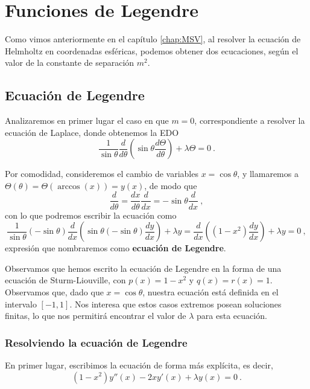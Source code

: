 \chapter{Funciones de Legendre}

Como vimos anteriormente en el capítulo \ref{chap:MSV}, al resolver la ecuación de Helmholtz en coordenadas esféricas, podemos obtener dos ecucaciones, según el valor de la constante de separación $m^2$. 

\section{Ecuación de Legendre}

Analizaremos en primer lugar el caso en que $m=0$, correspondiente a resolver la ecuación de Laplace, donde obtenemos la EDO
\begin{equation}
    \frac{1}{\sin\theta} \frac{d}{d\theta}\left( \sin\theta \frac{d\Theta}{d\theta} \right) + \lambda \Theta = 0 \ .
\end{equation}

Por comodidad, consideremos el cambio de variables $x = \cos\theta$, y llamaremos a $\Theta(\theta) = \Theta(\arccos(x)) = y(x)$, de modo que
\begin{equation}
    \frac{d}{d\theta} = \frac{dx}{d\theta} \frac{d}{dx} = -\sin\theta \frac{d}{dx} \ ,
\end{equation}
con lo que podremos escribir la ecuación como
\begin{equation}
    \frac{1}{\sin\theta}(-\sin\theta)\frac{d}{dx}\left( \sin\theta (-\sin\theta) \frac{dy}{dx} \right) + \lambda y = \frac{d}{dx}\left( (1-x^2) \frac{dy}{dx} \right) + \lambda y = 0 \ ,
\end{equation}
expresión que nombraremos como \textbf{ecuación de Legendre}.

Observamos que hemos escrito la ecuación de Legendre en la forma de una ecuación de Sturm-Liouville, con $p(x) = 1-x^2$ y $q(x) = r(x) = 1$. Observamos que, dado que $x=\cos\theta$, nuestra ecuación está definida en el intervalo $[-1,1]$. Nos interesa que estos casos extremos posean soluciones finitas, lo que nos permitirá encontrar el valor de $\lambda$ para esta ecuación.

\subsection{Resolviendo la ecuación de Legendre}

En primer lugar, escribimos la ecuación de forma más explícita, es decir,
\begin{equation}\label{eq:legendre_explicit}
    (1-x^2)y''(x) - 2x y'(x) + \lambda y(x) = 0 \ .
\end{equation}

